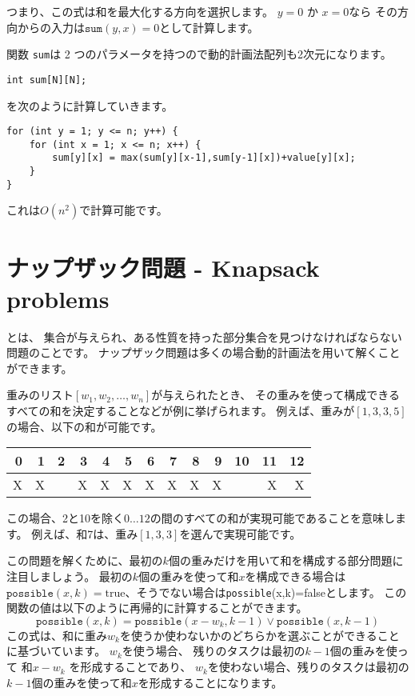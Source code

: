 つまり、この式は和を最大化する方向を選択します。
$y=0$ か $x=0$なら その方向からの入力は$\texttt{sum}(y,x)=0$として計算します。

関数 \texttt{sum}は 2 つのパラメータを持つので動的計画法配列も2次元になります。

\begin{lstlisting}
int sum[N][N];
\end{lstlisting}
を次のように計算していきます。
\begin{lstlisting}
for (int y = 1; y <= n; y++) {
    for (int x = 1; x <= n; x++) {
        sum[y][x] = max(sum[y][x-1],sum[y-1][x])+value[y][x];
    }
}
\end{lstlisting}

これは$O(n^2)$で計算可能です。

\section{ナップザック問題 - Knapsack problems}


とは、
集合が与えられ、ある性質を持った部分集合を見つけなければならない問題のことです。
ナップザック問題は多くの場合動的計画法を用いて解くことができます。

重みのリスト$[w_1,w_2,\ldots,w_n]$が与えられたとき、
その重みを使って構成できるすべての和を決定することなどが例に挙げられます。
例えば、重みが$[1,3,3,5]$の場合、以下の和が可能です。

\begin{center}
\begin{tabular}{rrrrrrrrrrrrr}
 0 & 1 & 2 & 3 & 4 & 5 & 6 & 7 & 8 & 9 & 10 & 11 & 12 \\
\hline
 X & X & & X & X & X & X & X & X & X & & X & X \\
\end{tabular}
\end{center}

この場合、2と10を除く$0 \ldots 12$の間のすべての和が実現可能であることを意味します。
例えば、和7は、重み$[1,3,3]$を選んで実現可能です。

この問題を解くために、最初の$k$個の重みだけを用いて和を構成する部分問題に注目しましょう。
最初の$k$個の重みを使って和$x$を構成できる場合は
$\texttt{possible}(x,k)=\textrm{true}、
そうでない場合は
$\texttt{possible}(x,k)=\textrm{false}とします。
この関数の値は以下のように再帰的に計算することができます。
\[ \texttt{possible}(x,k) = \texttt{possible}(x-w_k,k-1) \lor \texttt{possible}(x,k-1) \]
この式は、和に重み$w_k$を使うか使わないかのどちらかを選ぶことができることに基づいています。
$w_k$を使う場合、
残りのタスクは最初の$k - 1$個の重みを使って 和$x-w_k$ を形成することであり、
$w_k$を使わない場合、残りのタスクは最初の$k - 1$個の重みを使って和$x$を形成することになります。

